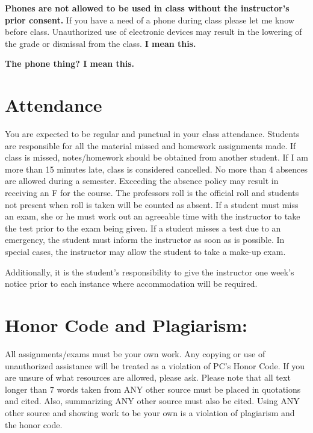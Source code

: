 \documentclass[
]{book}
\begin{document}
\textbf{Phones are not allowed to be used in class without the instructor's prior consent.} If you have a need of a phone during class please let me know before class. Unauthorized use of electronic devices may result in the lowering of the grade or dismissal from the class. \textbf{I mean this.}

\textbf{The phone thing? I mean this.}

\hypertarget{attendance}{%
\section*{Attendance}\label{attendance}}

You are expected to be regular and punctual in your class attendance. Students are responsible for all the material missed and homework assignments made. If class is missed, notes/homework should be obtained from another student. If I am more than 15 minutes late, class is considered cancelled. No more than 4 absences are allowed during a semester. Exceeding the absence policy may result in receiving an F for the course. The professors roll is the official roll and students not present when roll is taken will be counted as absent. If a student must miss an exam, she or he must work out an agreeable time with the instructor to take the test prior to the exam being given. If a student misses a test due to an emergency, the student must inform the instructor as soon as is possible. In special cases, the instructor may allow the student to take a make-up exam.

Additionally, it is the student's responsibility to give the instructor one week's notice prior to each instance where accommodation will be required.

\hypertarget{honor-code-and-plagiarism}{%
\section*{Honor Code and Plagiarism:}\label{honor-code-and-plagiarism}}

All assignments/exams must be your own work. Any copying or use of unauthorized assistance will be treated as a violation of PC's Honor Code. If you are unsure of what resources are allowed, please ask. Please note that all text longer than 7 words taken from ANY other source must be placed in quotations and cited. Also, summarizing ANY other source must also be cited. Using ANY other source and showing work to be your own is a violation of plagiarism and the honor code.
\end{document}
